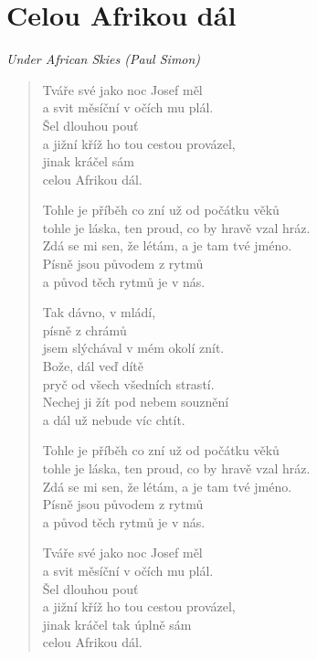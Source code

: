 \section*{Celou Afrikou dál}

\textit{Under African Skies (Paul Simon)}

\begin{verse}
Tváře své jako noc Josef měl \\
a svit měsíční v očích mu plál. \\
Šel dlouhou pouť \\
a jižní kříž ho tou cestou provázel, \\
jinak kráčel sám \\
celou Afrikou dál.

Tohle je příběh co zní už od počátku věků \\
tohle je láska, ten proud, co by hravě vzal hráz. \\
Zdá se mi sen, že létám, a je tam tvé jméno. \\
Písně jsou původem z rytmů \\
a původ těch rytmů je v nás.

Tak dávno, v mládí, \\
písně z chrámů \\
jsem slýchával v mém okolí znít. \\
Bože, dál veď dítě \\
pryč od všech všedních strastí. \\
Nechej ji žít pod nebem souznění \\
a dál už nebude víc chtít.

Tohle je příběh co zní už od počátku věků \\
tohle je láska, ten proud, co by hravě vzal hráz. \\
Zdá se mi sen, že létám, a je tam tvé jméno. \\
Písně jsou původem z rytmů \\
a původ těch rytmů je v nás.

Tváře své jako noc Josef měl \\
a svit měsíční v očích mu plál. \\
Šel dlouhou pouť \\
a jižní kříž ho tou cestou provázel, \\
jinak kráčel tak úplně sám \\
celou Afrikou dál.
\end{verse}
